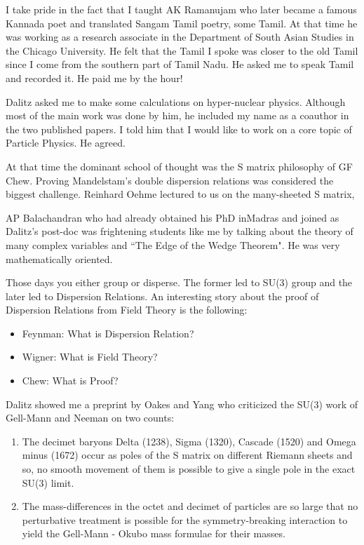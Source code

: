   
I take pride in the fact that I taught AK Ramanujam who later became
a famous Kannada poet and translated Sangam Tamil poetry, some Tamil.
At that time he was working as a research associate in the Department
of South Asian Studies in the Chicago University. He felt that the
Tamil I spoke was closer to the old Tamil since I come from the
southern part of Tamil Nadu. He asked me to speak Tamil and recorded it.
He paid me by the hour!


Dalitz asked me to make some calculations on hyper-nuclear physics. 
Although most of the main work was done by him, he included my name as a 
coauthor in the two published papers. I told him that I would like to 
work on a core topic of Particle Physics. He agreed.


At that time the dominant school of thought was the S matrix philosophy 
of GF Chew. Proving Mandelstam's double dispersion relations was 
considered the biggest challenge. Reinhard Oehme lectured to us on the 
many-sheeted S matrix, 


AP Balachandran who had already obtained his PhD in\break Madras and joined as 
Dalitz's post-doc was frightening students like me by talking about the 
theory of many complex variables and ``The Edge of the Wedge Theorem". He 
was very mathematically orien\-ted.


Those days you either group or disperse. The former led to SU(3) group 
and the later led to Dispersion Relations. An intere\-sting story about 
the proof of Dispersion Relations from Field Theory is the following:

\vspace{-\topsep}
\begin{itemize}
\itemsep=0pt
\item Feynman: What is Dispersion Relation? 
\item Wigner: What is Field Theory? 
\item Chew: What is Proof?
\end{itemize}
\vspace{-\topsep}

Dalitz showed me a preprint by Oakes and Yang who criticized the SU(3) 
work of Gell-Mann and Neeman on two counts:

\begin{enumerate}
\item The decimet baryons Delta (1238), Sigma (1320), Cascade (1520) and 
Omega minus (1672) occur as poles of the S matrix\- on different Riemann 
sheets and so, no smooth movement of them is possible to give a single 
pole in the exact SU(3) limit.

\item The mass-differences in the octet and decimet of particles are so 
large that no perturbative treatment is possible for the 
symmetry-breaking interaction to yield the Gell-Mann - Okubo mass 
formulae for their masses.
\end{enumerate}

